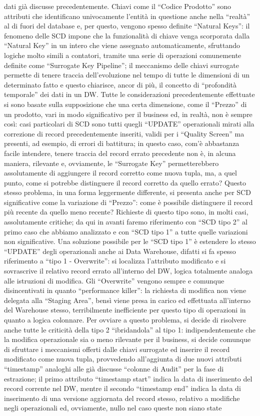 \documentclass[a4paper,12pt]{report}
\begin{document}
dati già discusse precedentemente. Chiavi come il “Codice Prodotto” sono attributi che identificano univocamente l’entità in questione anche nella “realtà” al di fuori del database e, per questo, vengono spesso definite “Natural Keys”: il fenomeno delle SCD impone che la funzionalità di chiave venga scorporata dalla “Natural Key” in un intero che viene assegnato automaticamente, sfruttando logiche molto simili a contatori, tramite una serie di operazioni comunemente definite come “Surrogate Key Pipeline”; il meccanismo delle chiavi surrogate permette di tenere traccia dell’evoluzione nel tempo di tutte le dimensioni di un determinato fatto e questo chiarisce, ancor di più, il concetto di “profondità temporale” dei dati in un DW. 
Tutte le considerazioni precedentemente effettuate si sono basate sulla supposizione che una certa dimensione, come il “Prezzo” di un prodotto, vari in modo significativo per il business ed, in realtà, non è sempre così: casi particolari di SCD sono tutti quegli “UPDATE” operazionali mirati alla correzione di record precedentemente inseriti, validi per i “Quality Screen” ma presenti, ad esempio, di errori di battitura; in questo caso, com’è abbastanza facile intendere, tenere traccia del record errato precedente non è, in alcuna maniera, rilevante e, ovviamente, le “Surrogate Key” permetterebbero assolutamente di aggiungere il record corretto come nuova tupla, ma, a quel punto, come si potrebbe distinguere il record corretto da quello errato? Questo stesso problema, in una forma leggermente differente, si presenta anche per SCD significative come la variazione di “Prezzo”: come è possibile distinguere il record più recente da quello meno recente? Richieste di questo tipo sono, in molti casi, assolutamente critiche; da qui in avanti faremo riferimento con “SCD tipo 2” al primo caso che abbiamo analizzato e con “SCD tipo 1” a tutte quelle variazioni non significative. Una soluzione possibile per le “SCD tipo 1” è estendere lo stesso “UPDATE” degli operazionali anche ai Data Warehouse, difatti si fa spesso riferimento a “tipo 1 - Overwrite”: si localizza l’attributo modificato e si sovrascrive il relativo record errato all’interno del DW, logica totalmente analoga alle istruzioni di modifica. Gli “Overwrite” vengono sempre e comunque disincentivati in quanto “performance killer”: la richiesta di modifica non viene delegata alla “Staging Area”, bensì viene presa in carico ed effettuata all’interno del Warehouse stesso, terribilmente inefficiente per questo tipo di operazioni in quanto a logica colonnare. Per ovviare a questo problema, si decide di risolvere anche tutte le criticità della tipo 2 “ibridandola” al tipo 1: indipendentemente che la modifica operazionale sia o meno rilevante per il business, si decide comunque di sfruttare i meccanismi offerti dalle chiavi surrogate ed inserire il record modificato come nuova tupla, provvedendo all’aggiunta di due nuovi attributi “timestamp” analoghi alle già discusse “colonne di Audit” per la fase di estrazione; il primo attributo “timestamp start” indica la data di inserimento del record corrente nel DW, mentre il secondo “timestamp end” indica la data di inserimento di una versione aggiornata del record stesso, relativo a modifiche negli operazionali ed, ovviamente, nullo nel caso queste non siano state 
\end{document}
